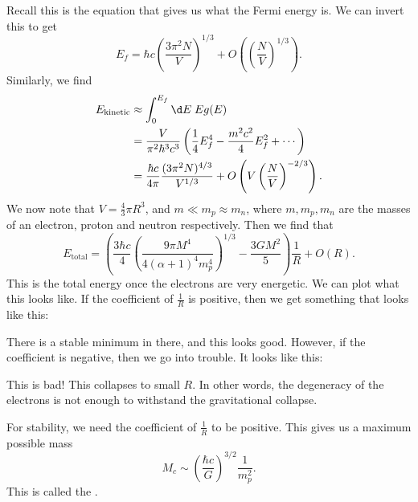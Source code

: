 \documentclass[a4paper]{article}
\begin{document}
Recall this is the equation that gives us what the Fermi energy is. We can invert this to get
\[
  E_f = \hbar c \left(\frac{3 \pi^2 N}{V}\right)^{1/3} + O\left(\left(\frac{N}{V}\right)^{1/3}\right).
\]
Similarly, we find
\begin{align*}
  E_{\mathrm{kinetic}} &\approx \int_0^{E_f}\d E\; E g(E) \\
  &= \frac{V}{\pi^2 \hbar^3 c^3} \left(\frac{1}{4} E_f^4 - \frac{m^2 c^2}{4} E_f^2 + \cdots\right) \\
  &= \frac{\hbar c}{4\pi}\frac{(3\pi^2 N)^{4/3}}{V^{1/3}} + O\left( V \left(\frac{N}{V}\right)^{-2/3}\right).
\end{align*}
We now note that $V = \frac{4}{3} \pi R^3$, and $m \ll m_p \approx m_n$, where $m, m_p, m_n$ are the masses of an electron, proton and neutron respectively. Then we find that
\[
  E_{\mathrm{total}} = \left(\frac{3\hbar c}{4} \left(\frac{9 \pi M^4}{4(\alpha + 1)^4 m_p^4}\right)^{1/3} - \frac{3GM^2}{5}\right) \frac{1}{R} + O(R).
\]
This is the total energy once the electrons are very energetic. We can plot what this looks like. If the coefficient of $\frac{1}{R}$ is positive, then we get something that looks like this:
\begin{center}
\end{center}
There is a stable minimum in there, and this looks good. However, if the coefficient is negative, then we go into trouble. It looks like this:
\begin{center}
\end{center}
This is bad! This collapses to small $R$. In other words, the degeneracy of the electrons is not enough to withstand the gravitational collapse.

For stability, we need the coefficient of $\frac{1}{R}$ to be positive. This gives us a maximum possible mass
\[
  M_c \sim \left(\frac{\hbar c}{G}\right)^{3/2} \frac{1}{m_p^2}.
\]
This is called the .
\end{document}
